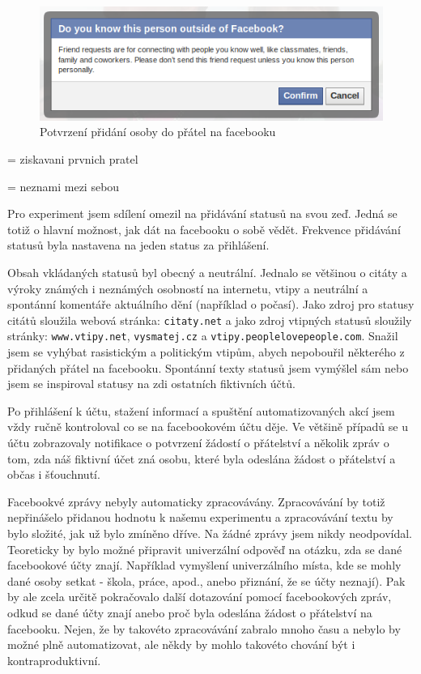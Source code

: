 \documentclass[thesis=M,czech]{FITthesis}[2013/05/10]
\begin{document}
\begin{figure}[h]
\begin{center}
\includegraphics[width=5in]{figures/confirm-friendship.png}
\caption{Potvrzení přidání osoby do přátel na facebooku}
\label{fig:confirmFriendship}
\end{center}
\end{figure}
= ziskavani prvnich pratel

= neznami mezi sebou



Pro experiment jsem sdílení omezil na přidávání statusů na svou zeď. Jedná se totiž o hlavní možnost, jak dát na facebooku o sobě vědět. Frekvence přidávání statusů byla nastavena na jeden status za přihlášení. 

Obsah vkládaných statusů byl obecný a neutrální. Jednalo se většinou o citáty a výroky známých i neznámých osobností na internetu, vtipy a neutrální a spontánní komentáře aktuálního dění (například o počasí). Jako zdroj pro statusy citátů sloužila webová stránka: \verb|citaty.net| a jako zdroj vtipných statusů sloužily stránky: \verb|www.vtipy.net|, \verb|vysmatej.cz| a \verb|vtipy.peoplelovepeople.com|. Snažil jsem se vyhýbat rasistickým a politickým vtipům, abych nepobouřil některého z přidaných přátel na facebooku. Spontánní texty statusů jsem vymýšlel sám nebo jsem se inspiroval statusy na zdi ostatních fiktivních účtů.


 Po přihlášení k účtu, stažení informací a spuštění automatizovaných akcí jsem vždy ručně kontroloval co se na facebookovém účtu děje. Ve většině případů se u účtu zobrazovaly notifikace o potvrzení žádostí o přátelství a několik zpráv o tom, zda náš fiktivní účet zná osobu, které byla odeslána žádost o přátelství a občas i šťouchnutí.


Facebookvé zprávy nebyly automaticky zpracovávány. Zpracovávání by totiž nepřinášelo přidanou hodnotu k našemu experimentu a zpracovávání textu by bylo složité, jak už bylo zmíněno dříve. Na žádné zprávy jsem nikdy neodpovídal. Teoreticky by bylo možné připravit univerzální odpověď na otázku, zda se dané facebookové účty znají. Například vymyšlení univerzálního místa, kde se mohly dané osoby setkat - škola, práce, apod., anebo přiznání, že se účty neznají). Pak by ale zcela určitě pokračovalo další dotazování pomocí facebookových zpráv, odkud se dané účty znají anebo proč byla odeslána žádost o přátelství na facebooku. Nejen, že by takovéto zpracovávání zabralo mnoho času a nebylo by možné plně automatizovat, ale někdy by mohlo takovéto chování být i kontraproduktivní.
\end{document}

